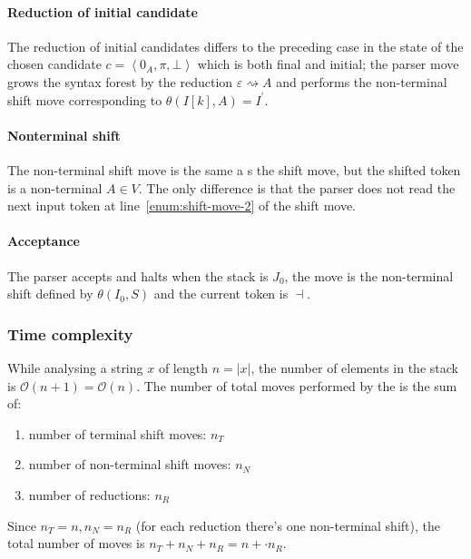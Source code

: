 \documentclass[english]{article}
\begin{document}
\paragraph*{Reduction of initial candidate}

The reduction of initial candidates differs to the preceding case in the state of the chosen candidate \(c = \left\langle 0_A, \pi, \bot \right\rangle\) which is both final and initial;
the parser move grows the syntax forest by the reduction \(\varepsilon \rightsquigarrow A\) and performs the non-terminal shift move corresponding to \(\theta(I[k], A) = I^\prime\).

\paragraph*{Nonterminal shift}

The non-terminal shift move is the same a s the shift move, but the shifted token is a non-terminal \(A \in V\).
The only difference is that the parser does not read the next input token at line~\ref{enum:shift-move-2} of the shift move.

\paragraph*{Acceptance}

The parser accepts and halts when the stack is \(J_0\), the move is the non-terminal shift defined by \(\theta(I_0, S)\) and the current token is \(\dashv\).

\subsubsection{Time complexity}

While analysing a string \(x\) of length \(n = |x|\), the number of elements in the stack is \(\mathcal{O}(n+1)=\mathcal{O}(n)\).
The number of total moves performed by the \PDA is the sum of:

\begin{enumerate}
  \item number of terminal shift moves: \(n_T\)
  \item number of non-terminal shift moves: \(n_N\)
  \item number of reductions: \(n_R\)
\end{enumerate}

Since \(n_T = n, n_N=n_R\) (for each reduction there's one non-terminal shift), the total number of moves is \(n_T + n_N + n_R = n +  \cdot n_R\).
\end{document}
